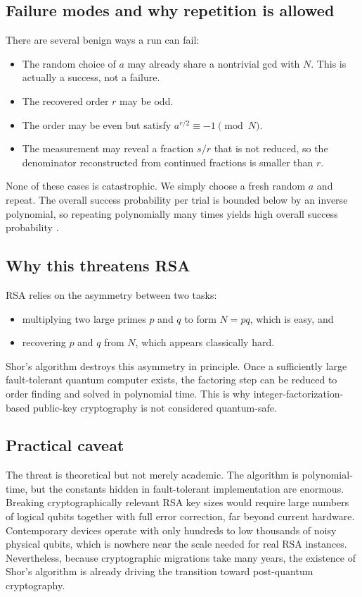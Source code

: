 \subsection{Failure modes and why repetition is allowed}

There are several benign ways a run can fail:
\begin{itemize}
    \item The random choice of $a$ may already share a nontrivial gcd with $N$. This is actually a success, not a failure.
    \item The recovered order $r$ may be odd.
    \item The order may be even but satisfy $a^{r/2} \equiv -1 \pmod N$.
    \item The measurement may reveal a fraction $s/r$ that is not reduced, so the denominator reconstructed from continued fractions is smaller than $r$.
\end{itemize}
None of these cases is catastrophic. We simply choose a fresh random $a$ and repeat. The overall success probability per trial is bounded below by an inverse polynomial, so repeating polynomially many times yields high overall success probability \cite{NC10}.

\subsection{Why this threatens RSA}

RSA relies on the asymmetry between two tasks:
\begin{itemize}
    \item multiplying two large primes $p$ and $q$ to form $N=pq$, which is easy, and
    \item recovering $p$ and $q$ from $N$, which appears classically hard.
\end{itemize}
Shor's algorithm destroys this asymmetry in principle. Once a sufficiently large fault-tolerant quantum computer exists, the factoring step can be reduced to order finding and solved in polynomial time. This is why integer-factorization-based public-key cryptography is not considered quantum-safe.

\subsection{Practical caveat}

The threat is theoretical but not merely academic. The algorithm is polynomial-time, but the constants hidden in fault-tolerant implementation are enormous. Breaking cryptographically relevant RSA key sizes would require large numbers of logical qubits together with full error correction, far beyond current hardware. Contemporary devices operate with only hundreds to low thousands of noisy physical qubits, which is nowhere near the scale needed for real RSA instances. Nevertheless, because cryptographic migrations take many years, the existence of Shor's algorithm is already driving the transition toward post-quantum cryptography.

